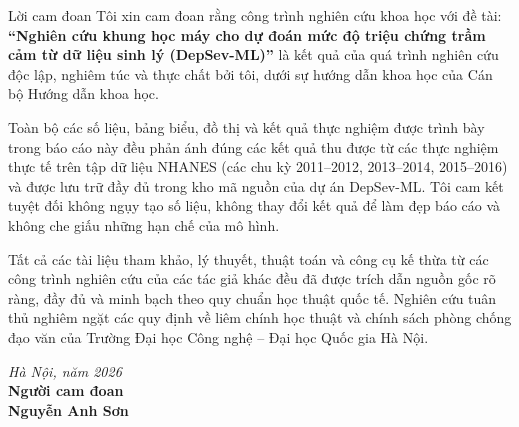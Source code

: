 \documentclass{uetgraduation}
\begin{document}
\begin{preamble}{Lời cam đoan}
Tôi xin cam đoan rằng công trình nghiên cứu khoa học với đề tài: \textbf{“Nghiên cứu khung học máy cho dự đoán mức độ triệu chứng trầm cảm từ dữ liệu sinh lý (DepSev-ML)”} là kết quả của quá trình nghiên cứu độc lập, nghiêm túc và thực chất bởi tôi, dưới sự hướng dẫn khoa học của Cán bộ Hướng dẫn khoa học.

Toàn bộ các số liệu, bảng biểu, đồ thị và kết quả thực nghiệm được trình bày trong báo cáo này đều phản ánh đúng các kết quả thu được từ các thực nghiệm thực tế trên tập dữ liệu NHANES (các chu kỳ 2011--2012, 2013--2014, 2015--2016) và được lưu trữ đầy đủ trong kho mã nguồn của dự án DepSev-ML. Tôi cam kết tuyệt đối không ngụy tạo số liệu, không thay đổi kết quả để làm đẹp báo cáo và không che giấu những hạn chế của mô hình.

Tất cả các tài liệu tham khảo, lý thuyết, thuật toán và công cụ kế thừa từ các công trình nghiên cứu của các tác giả khác đều đã được trích dẫn nguồn gốc rõ ràng, đầy đủ và minh bạch theo quy chuẩn học thuật quốc tế. Nghiên cứu tuân thủ nghiêm ngặt các quy định về liêm chính học thuật và chính sách phòng chống đạo văn của Trường Đại học Công nghệ -- Đại học Quốc gia Hà Nội.

\vspace{1.5cm}
\begin{flushright}
\textit{Hà Nội, năm 2026}\\[0.2cm]
\textbf{Người cam đoan}\\[1.5cm]
\textbf{Nguyễn Anh Sơn}
\end{flushright}
\end{preamble}
\end{document}
